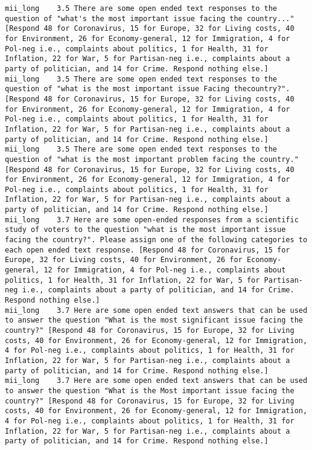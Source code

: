\begin{lstlisting}[label=lst:promptvariants]
mii_long	3.5	There are some open ended text responses to the question of "what's the most important issue facing the country..." [Respond 48 for Coronavirus, 15 for Europe, 32 for Living costs, 40 for Environment, 26 for Economy-general, 12 for Immigration, 4 for Pol-neg i.e., complaints about politics, 1 for Health, 31 for Inflation, 22 for War, 5 for Partisan-neg i.e., complaints about a party of politician, and 14 for Crime. Respond nothing else.]
mii_long	3.5	There are some open ended text responses to the question of "what is the most important issue Facing thecountry?". [Respond 48 for Coronavirus, 15 for Europe, 32 for Living costs, 40 for Environment, 26 for Economy-general, 12 for Immigration, 4 for Pol-neg i.e., complaints about politics, 1 for Health, 31 for Inflation, 22 for War, 5 for Partisan-neg i.e., complaints about a party of politician, and 14 for Crime. Respond nothing else.]
mii_long	3.5	There are some open ended text responses to the question of "what is the most important problem facing the country." [Respond 48 for Coronavirus, 15 for Europe, 32 for Living costs, 40 for Environment, 26 for Economy-general, 12 for Immigration, 4 for Pol-neg i.e., complaints about politics, 1 for Health, 31 for Inflation, 22 for War, 5 for Partisan-neg i.e., complaints about a party of politician, and 14 for Crime. Respond nothing else.]
mii_long	3.7	Here are some open-ended responses from a scientific study of voters to the question "what is the most important issue facing the country?". Please assign one of the following categories to each open ended text response. [Respond 48 for Coronavirus, 15 for Europe, 32 for Living costs, 40 for Environment, 26 for Economy-general, 12 for Immigration, 4 for Pol-neg i.e., complaints about politics, 1 for Health, 31 for Inflation, 22 for War, 5 for Partisan-neg i.e., complaints about a party of politician, and 14 for Crime. Respond nothing else.]
mii_long	3.7	Here are some open ended text answers that can be used to answer the question "What is the most significant issue facing the country?" [Respond 48 for Coronavirus, 15 for Europe, 32 for Living costs, 40 for Environment, 26 for Economy-general, 12 for Immigration, 4 for Pol-neg i.e., complaints about politics, 1 for Health, 31 for Inflation, 22 for War, 5 for Partisan-neg i.e., complaints about a party of politician, and 14 for Crime. Respond nothing else.]
mii_long	3.7	Here are some open ended text answers that can be used to answer the question "What is the Most important issue facing the country?" [Respond 48 for Coronavirus, 15 for Europe, 32 for Living costs, 40 for Environment, 26 for Economy-general, 12 for Immigration, 4 for Pol-neg i.e., complaints about politics, 1 for Health, 31 for Inflation, 22 for War, 5 for Partisan-neg i.e., complaints about a party of politician, and 14 for Crime. Respond nothing else.]

\end{lstlisting}
